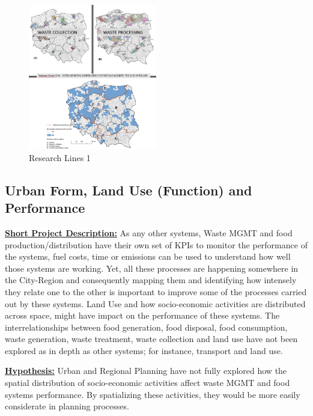 \begin{figure}[hbt!]
    \centering
    \includegraphics[width=0.5\textwidth]{Imgs/rl_1.PNG}
    \caption{Research Lines 1}
    \label{fig:rl1}
\end{figure}






\subsection{Urban Form, Land Use (Function) and Performance}
\textbf{\underline {Short Project Description:}}  As any other systems, Waste MGMT and food production/distribution have their own set of KPIs to monitor the performance of the systems, fuel costs, time or emissions can be used to understand how well those systems are working. Yet, all these processes are happening somewhere in the City-Region and consequently mapping them and identifying how intensely they relate one to the other is important to improve some of the processes carried out by these systems.
Land Use and how socio-economic activities are distributed across space, might have impact on the performance of these systems. The interrelationships between food generation, food disposal, food consumption, waste generation, waste treatment, waste collection and land use have not been explored as in depth as other systems; for instance, transport and land use.  \par


\textbf{\underline {Hypothesis:}}  Urban and Regional Planning have not fully explored how the spatial distribution of socio-economic activities affect waste MGMT and food systems performance. By spatializing these activities, they would be more easily considerate in planning processes. \par


